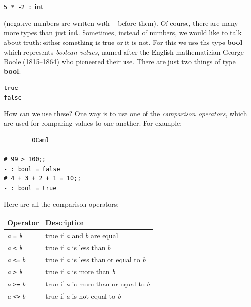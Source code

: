 \documentclass[]{book}
\newcommand{\smspace}{\vspace{4mm}}
\begin{document}
\smspace
\texttt{5 * -2 :}\textbf{\textrm{ int}}
\smspace

\noindent (negative numbers are written with \texttt{-} before them). Of course, there are many more types than just \textrm{\textbf{int}}. Sometimes, instead of numbers, we would like to talk about truth: either something is true or it is not. For this we use the type \textrm{\textbf{bool}} which represents \textit{boolean values}, named after the English mathematician George Boole (1815--1864) who pioneered their use. There are just two things of type \textbf{\textrm{bool}}:

\smspace
{}\noindent\hspace{20mm}\texttt{true}\\
\hspace{20mm}\texttt{false}
\smspace

\noindent How can we use these? One way is to use one of the \textit{comparison operators}, which are used for comparing values to one another. For example:

\smspace
\noindent\verb!        OCaml!\\
\noindent\\
\noindent\verb!# 99 > 100;;!\\
\noindent\verb!- : bool = false!\\
\noindent\verb!# 4 + 3 + 2 + 1 = 10;;!\\
\noindent\verb!- : bool = true!
\smspace

\noindent Here are all the comparison operators:

\smspace
\noindent\begin{tabular}{@{}ll@{}} \toprule
Operator & Description\\
\midrule
\index{=@\texttt{=}}\textit{a} \texttt{=} \textit{b} & true if \textit{a} and \textit{b} are equal\\
\index{<@\texttt{<}}\textit{a} \texttt{<} \textit{b} & true if \textit{a} is less than \textit{b}\\
\index{<=@\texttt{<=}}\textit{a} \texttt{<=} \textit{b} & true if \textit{a} is less than or equal to \textit{b}\\
\index{>@\texttt{>}}\textit{a} \texttt{>} \textit{b} & true if \textit{a} is more than \textit{b}\\
\index{>=@\texttt{>=}}\textit{a} \texttt{>=} \textit{b} & true if \textit{a} is more than or equal to \textit{b}\\
\index{<>@\texttt{<>}}\textit{a} \texttt{<>} \textit{b} & true if \textit{a} is not equal to \textit{b}\\ \bottomrule
\end{tabular}
\smspace
\end{document}
